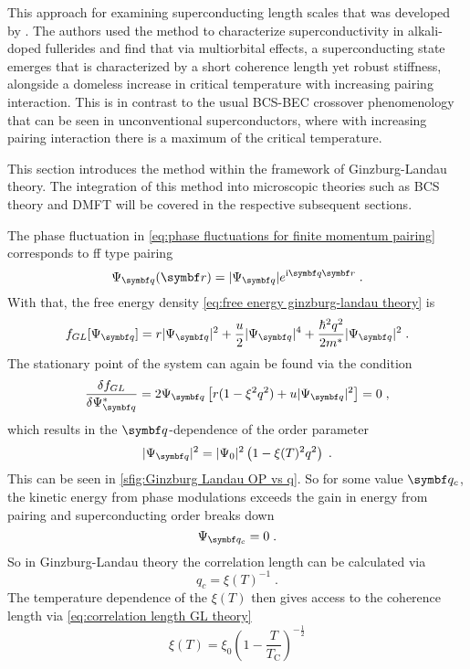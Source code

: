 \documentclass[../main.tex]{subfiles}
\begin{document}
This approach for examining superconducting length scales that was developed by \citeauthor{wittBypassingLatticeBCS2024} \cite{wittBypassingLatticeBCS2024}.
The authors used the method to characterize superconductivity in alkali-doped fullerides and find that via multiorbital effects, a superconducting state emerges that is characterized by a short coherence length yet robust stiffness, alongside a domeless increase in critical temperature with increasing pairing interaction.
This is in contrast to the usual BCS-BEC crossover phenomenology that can be seen in unconventional superconductors, where with increasing pairing interaction there is a maximum of the critical temperature.

This section introduces the method within the framework of Ginzburg-Landau theory.
The integration of this method into microscopic theories such as BCS theory and DMFT will be covered in the respective subsequent sections.

The phase fluctuation in \cref{eq:phase fluctuations for finite momentum pairing} corresponds to \gls{ff} type pairing \cite{kinnunenFuldeFerrellLarkin2018}
\begin{equation}
	\Psi_{\vb{q}} (\vb{r}) = \vert \Psi_{\vb{q}} \vert e^{\iu \vb{q} \vb{r}} \;.
\end{equation}
With that, the free energy density \cref{eq:free energy ginzburg-landau theory} is
\begin{equation}
	f_{GL} [\Psi_{\vb{q}}] = r \vert \Psi_{\vb{q}} \vert^2 + \frac{u}{2} \vert \Psi_{\vb{q}} \vert^4 + \frac{\hbar^2 q^2}{2 m^*} \vert \Psi_{\vb{q}} \vert^2 \;.
\end{equation}
The stationary point of the system can again be found via the condition
\begin{equation}
	\fdv{f_{GL}}{\Psi_{\vb{q}}^*} = 2 \Psi_{\vb{q}} \left[r (1 - \xi^2 q^2) + u \vert \Psi_{\vb{q}} \vert^2\right] = 0 \;,
\end{equation}
which results in the \(\vb{q}\)-dependence of the order parameter
\begin{equation}
	\vert \Psi_{\vb{q}} \vert^2 = \vert \Psi_{0} \vert^2 \left(1 - \xi(T)^2 q^2\right) \;.
\end{equation}
This can be seen in \cref{sfig:Ginzburg Landau OP vs q}.
So for some value \(\vb{q}_c\), the kinetic energy from phase modulations exceeds the gain in energy from pairing and superconducting order breaks down
\begin{equation}
	\Psi_{\vb{q}_c} = 0 \;.
\end{equation}
So in Ginzburg-Landau theory the correlation length can be calculated via
\begin{equation}
	q_c = \xi(T)^{-1} \;.
\end{equation}
The temperature dependence of the \(\xi(T)\) then gives access to the coherence length via \cref{eq:correlation length GL theory}
\begin{equation}
	\xi(T) = \xi_0 \left(1 - \frac{T}{T_{\mathrm{C}}}\right)^{-\frac{1}{2}}
\end{equation}
\end{document}
